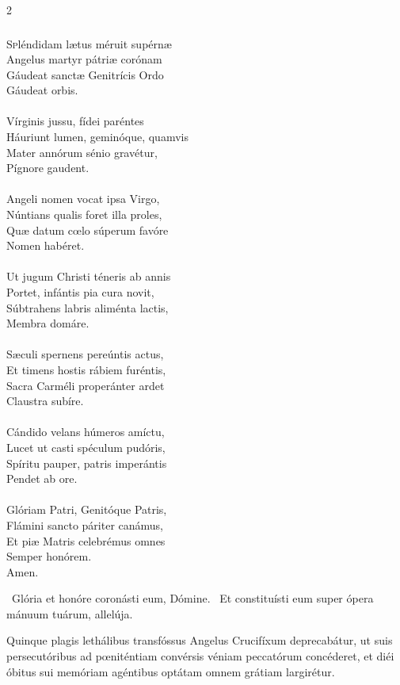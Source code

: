 \documentclass[9pt,twoside]{extarticle}
\begin{document}
\begin{multicols}{2}
{\subsubsection*{\center {}}
\lettrine{S}pléndidam lætus méruit supérnæ\\
Angelus martyr pátriæ corónam\\
Gáudeat sanctæ Genitrícis Ordo\\
Gáudeat orbis.\\
\\
Vírginis jussu, fídei paréntes\\
Háuriunt lumen, geminóque, quamvis\\
Mater annórum sénio gravétur,\\
Pígnore gaudent.\\
\\
Angeli nomen vocat ipsa Virgo,\\
Núntians qualis foret illa proles,\\
Quæ datum cœlo súperum favóre\\
Nomen habéret.\\
\\
Ut jugum Christi téneris ab annis\\
Portet, infántis pia cura novit,\\
Súbtrahens labris aliménta lactis,\\
Membra domáre.\\
\\
Sæculi spernens pereúntis actus,\\
Et timens hostis rábiem furéntis,\\
Sacra Carméli properánter ardet\\
Claustra subíre.\\
\\
Cándido velans húmeros amíctu,\\
Lucet ut casti spéculum pudóris,\\
Spíritu pauper, patris imperántis\\
Pendet ab ore.\\
\\
Glóriam Patri, Genitóque Patris,\\
Flámini sancto páriter canámus,\\
Et piæ Matris celebrémus omnes\\
Semper honórem.\\
Amen.

\begin{tightlist}{}
\item {}~Glória et honóre coronásti eum, Dómine. ~Et constituísti eum super ópera mánuum tuárum, allelúja.
\item {} Quinque plagis lethálibus transfóssus Angelus Crucifíxum deprecabátur, ut suis persecutóribus ad pœniténtiam convérsis véniam peccatórum concéderet, et diéi óbitus sui memóriam agéntibus optátam omnem grátiam largirétur.
\end{tightlist}

}
\end{multicols}
\end{document}
